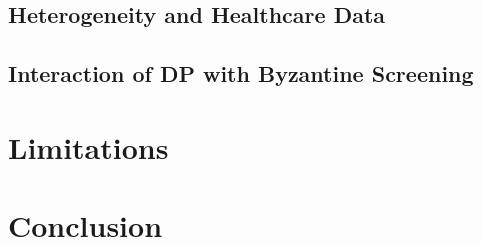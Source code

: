\documentclass[conference]{IEEEtran}
\begin{document}
\subsection{Heterogeneity and Healthcare Data}

\subsection{Interaction of DP with Byzantine Screening}

\section{Limitations}

\section{Conclusion}



\end{document}
